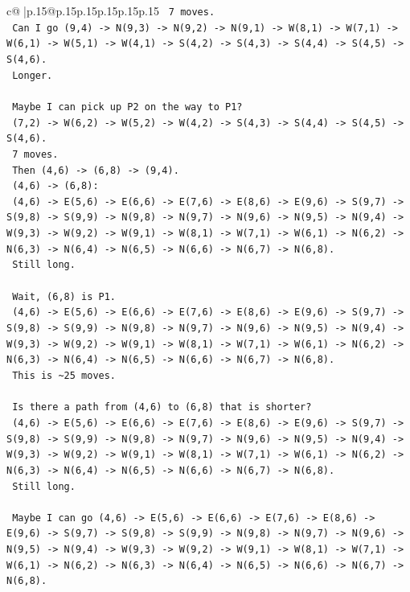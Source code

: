 \documentclass{article}
\begin{document}
{\begin{supertabular}{c@{$\;$}|p{.15\linewidth}@{}p{.15\linewidth}p{.15\linewidth}p{.15\linewidth}p{.15\linewidth}p{.15\linewidth}}
{{{\texttt{    7 moves.} \\
\texttt{    Can I go (9,4) {-}> N(9,3) {-}> N(9,2) {-}> N(9,1) {-}> W(8,1) {-}> W(7,1) {-}> W(6,1) {-}> W(5,1) {-}> W(4,1) {-}> S(4,2) {-}> S(4,3) {-}> S(4,4) {-}> S(4,5) {-}> S(4,6).} \\
\texttt{    Longer.} \\
\\ 
\texttt{    Maybe I can pick up P2 on the way to P1?} \\
\texttt{    (7,2) {-}> W(6,2) {-}> W(5,2) {-}> W(4,2) {-}> S(4,3) {-}> S(4,4) {-}> S(4,5) {-}> S(4,6).} \\
\texttt{    7 moves.} \\
\texttt{    Then (4,6) {-}> (6,8) {-}> (9,4).} \\
\texttt{    (4,6) {-}> (6,8):} \\
\texttt{    (4,6) {-}> E(5,6) {-}> E(6,6) {-}> E(7,6) {-}> E(8,6) {-}> E(9,6) {-}> S(9,7) {-}> S(9,8) {-}> S(9,9) {-}> N(9,8) {-}> N(9,7) {-}> N(9,6) {-}> N(9,5) {-}> N(9,4) {-}> W(9,3) {-}> W(9,2) {-}> W(9,1) {-}> W(8,1) {-}> W(7,1) {-}> W(6,1) {-}> N(6,2) {-}> N(6,3) {-}> N(6,4) {-}> N(6,5) {-}> N(6,6) {-}> N(6,7) {-}> N(6,8).} \\
\texttt{    Still long.} \\
\\ 
\texttt{    Wait, (6,8) is P1.} \\
\texttt{    (4,6) {-}> E(5,6) {-}> E(6,6) {-}> E(7,6) {-}> E(8,6) {-}> E(9,6) {-}> S(9,7) {-}> S(9,8) {-}> S(9,9) {-}> N(9,8) {-}> N(9,7) {-}> N(9,6) {-}> N(9,5) {-}> N(9,4) {-}> W(9,3) {-}> W(9,2) {-}> W(9,1) {-}> W(8,1) {-}> W(7,1) {-}> W(6,1) {-}> N(6,2) {-}> N(6,3) {-}> N(6,4) {-}> N(6,5) {-}> N(6,6) {-}> N(6,7) {-}> N(6,8).} \\
\texttt{    This is \textasciitilde{}25 moves.} \\
\\ 
\texttt{    Is there a path from (4,6) to (6,8) that is shorter?} \\
\texttt{    (4,6) {-}> E(5,6) {-}> E(6,6) {-}> E(7,6) {-}> E(8,6) {-}> E(9,6) {-}> S(9,7) {-}> S(9,8) {-}> S(9,9) {-}> N(9,8) {-}> N(9,7) {-}> N(9,6) {-}> N(9,5) {-}> N(9,4) {-}> W(9,3) {-}> W(9,2) {-}> W(9,1) {-}> W(8,1) {-}> W(7,1) {-}> W(6,1) {-}> N(6,2) {-}> N(6,3) {-}> N(6,4) {-}> N(6,5) {-}> N(6,6) {-}> N(6,7) {-}> N(6,8).} \\
\texttt{    Still long.} \\
\\ 
\texttt{    Maybe I can go (4,6) {-}> E(5,6) {-}> E(6,6) {-}> E(7,6) {-}> E(8,6) {-}> E(9,6) {-}> S(9,7) {-}> S(9,8) {-}> S(9,9) {-}> N(9,8) {-}> N(9,7) {-}> N(9,6) {-}> N(9,5) {-}> N(9,4) {-}> W(9,3) {-}> W(9,2) {-}> W(9,1) {-}> W(8,1) {-}> W(7,1) {-}> W(6,1) {-}> N(6,2) {-}> N(6,3) {-}> N(6,4) {-}> N(6,5) {-}> N(6,6) {-}> N(6,7) {-}> N(6,8).} \\
}}}
\end{supertabular}}
\end{document}
